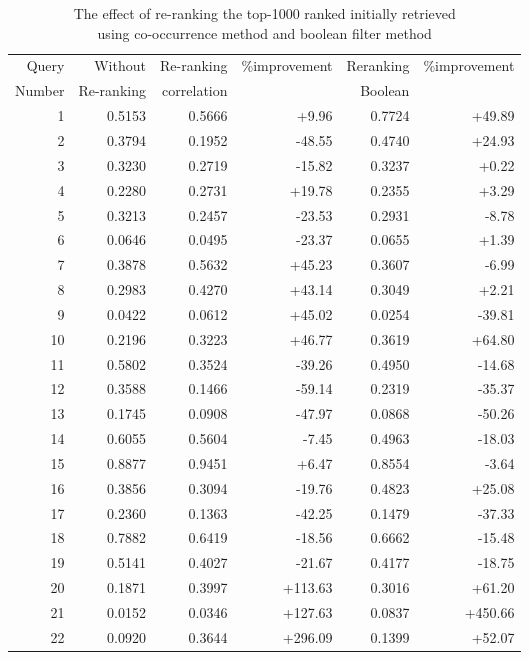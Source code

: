 \begin{table}[hbpt]
  \begin{center} 
   \tiny
    \caption{The effect of re-ranking the top-1000 ranked initially retrieved \\ using co-occurrence method and boolean filter method}
   \vspace{3mm}
   \begin{tabular}{|r|r|r|r|r|r|} \hline
Query & Without & Re-ranking & \%improvement & Reranking & \%improvement \\ 
Number   & Re-ranking & correlation &  &Boolean &  \\ \hline 
1 & 0.5153 & 0.5666  & +9.96 & 0.7724 & +49.89 \\ 
2 & 0.3794 & 0.1952  & -48.55 & 0.4740 & +24.93 \\ 
3 & 0.3230 & 0.2719  & -15.82 & 0.3237 & +0.22 \\ 
4 & 0.2280 & 0.2731  & +19.78 & 0.2355 & +3.29 \\ 
5 & 0.3213 & 0.2457  & -23.53 & 0.2931 & -8.78 \\ 
6 & 0.0646 & 0.0495  & -23.37 & 0.0655 & +1.39 \\ 
7 & 0.3878 & 0.5632  & +45.23 & 0.3607 & -6.99 \\ 
8 & 0.2983 & 0.4270  & +43.14 & 0.3049 & +2.21 \\ 
9 & 0.0422 & 0.0612  & +45.02 & 0.0254 & -39.81 \\ 
10 & 0.2196 & 0.3223  & +46.77 & 0.3619 & +64.80 \\ 
11 & 0.5802 & 0.3524  & -39.26 & 0.4950 & -14.68 \\ 
12 & 0.3588 & 0.1466  & -59.14 & 0.2319 & -35.37 \\ 
13 & 0.1745 & 0.0908  & -47.97 & 0.0868 & -50.26 \\ 
14 & 0.6055 & 0.5604  & -7.45 & 0.4963 & -18.03 \\ 
15 & 0.8877 & 0.9451  & +6.47 & 0.8554 & -3.64 \\ 
16 & 0.3856 & 0.3094  & -19.76 & 0.4823 & +25.08 \\ 
17 & 0.2360 & 0.1363  & -42.25 & 0.1479 & -37.33 \\ 
18 & 0.7882 & 0.6419  & -18.56 & 0.6662 & -15.48 \\ 
19 & 0.5141 & 0.4027  & -21.67 & 0.4177 & -18.75 \\ 
20 & 0.1871 & 0.3997  & +113.63 & 0.3016 & +61.20 \\ 
21 & 0.0152 & 0.0346  & +127.63 & 0.0837 & +450.66 \\ 
22 & 0.0920 & 0.3644  & +296.09 & 0.1399 & +52.07 \\ 

\end{tabular}
\end{center}
\end{table}
